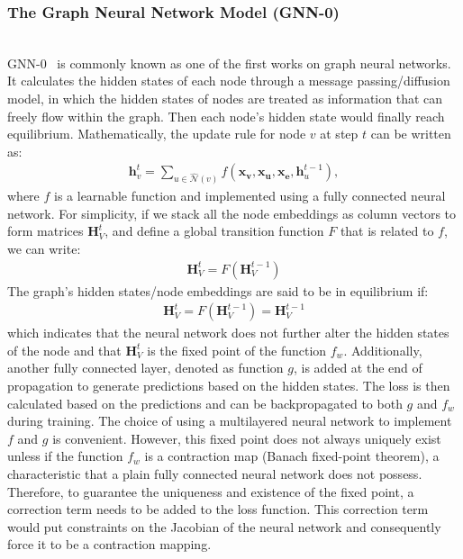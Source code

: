 \subsubsection{The Graph Neural Network Model (GNN-0)}\hfill \\
GNN-0~\cite{gnn0} is commonly known as one of the first works on graph neural networks. It calculates the hidden states of each node through a message passing/diffusion model, in which the hidden states of nodes are treated as information that can freely flow within the graph. Then each node's hidden state would finally reach equilibrium. Mathematically, the update rule for node $v$ at step $t$ can be written as:
\begin{gather}
\mathbf{h}_v ^t = \sum_{u \in \hat {\mathcal {N}}(v)} f(\mathbf{x_v}, \mathbf{x_u}, \mathbf{x_e}, \mathbf{h}_u^{t-1}),
\end{gather}
where $f$ is a learnable function and implemented using a fully connected neural network. For simplicity, if we stack all the node embeddings as column vectors to form matrices $\mathbf{H}_V^t$, and define a global transition function $F$ that is related to $f$, we can write:
\begin{gather}
\mathbf{H}_V^t = F(\mathbf{H}_V^{t-1})
\end{gather}
The graph's hidden states/node embeddings are said to be in equilibrium if:
\begin{gather}
\mathbf{H}_V^t = F(\mathbf{H}_V^{t-1}) = \mathbf{H}_V^{t-1}
\end{gather}
which indicates that the neural network does not further alter the hidden states of the node and that $\mathbf{H}_V^t$ is the fixed point of the function $f_w$. Additionally, another fully connected layer, denoted as function $g$, is added at the end of propagation to generate predictions based on the hidden states. The loss is then calculated based on the predictions and can be backpropagated to both $g$ and $f_w$ during training. The choice of using a multilayered neural network to implement $f$ and $g$ is convenient. However, this fixed point does not always uniquely exist unless if the function $f_w$ is a contraction map (Banach fixed-point theorem), a characteristic that a plain fully connected neural network does not possess. Therefore, to guarantee the uniqueness and existence of the fixed point, a correction term needs to be added to the loss function. This correction term would put constraints on the Jacobian of the neural network and consequently force it to be a contraction mapping.

